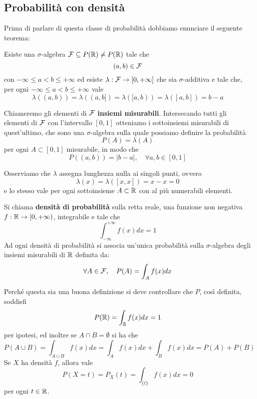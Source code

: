 \subsection{Probabilità con densità}
Prima di parlare di questa classe di probabilità dobbiamo enunciare il seguente teorema:
\begin{theorem}
	Esiste una $\sigma$-algebra $\mathcal{F} \subseteq P(\mathbb{R}) \neq P(\mathbb{R})$ tale che
	\[ (a, b) \in \mathcal{F} \]
	con $-\infty \leq a < b \leq +\infty$ ed esiste $\lambda : \mathcal{F} \to [0, +\infty]$ che sia
	$\sigma$-additiva e tale che, per ogni $-\infty \leq a < b \leq +\infty$ vale
	\[ \lambda((a,b)) = \lambda((a,b]) = \lambda ([a,b)) = \lambda([a,b]) = b - a \]
\end{theorem}

Chiameremo gli elementi di $\mathcal{F}$ \textbf{insiemi misurabili}. Intersecando tutti gli elementi di
$\mathcal{F}$ con l'intervallo $[0,1]$ otteniamo i sottoinsiemi misurabili di quest'ultimo, che sono una
$\sigma$-algebra sulla quale possiamo definire la probabilità
\[ P (A) = \lambda (A) \]
per ogni $A \subset [0,1]$ misurabile, in modo che
\[ P((a, b)) = |b - a|, \quad \forall a,b \in [0,1] \]

\begin{observation}
	Osserviamo che $\lambda$ assegna lunghezza nulla ai singoli punti, ovvero
	\[ \lambda(x) = \lambda([x,x]) = x - x = 0 \]
	e lo stesso vale per ogni sottoinsieme $A \subset \mathbb{R}$ con al più numerabili elementi.
\end{observation}

\begin{definition}
	Si chiama \textbf{densità di probabilità} sulla retta reale, una funzione non negativa
	$f : \mathbb{R} \to [0, +\infty)$, integrabile e tale che
	\[ \int_{-\infty}^{+\infty} f(x) dx = 1 \]
	Ad ogni densità di probabilità si associa un'unica probabilità sulla $\sigma$-algebra degli
	insiemi misurabili di $\mathbb{R}$ definita da:
	\[ \forall A \in \mathcal{F}, \quad P(A) = \int_A f(x) dx \]
\end{definition}

Perché questa sia una buona definizione si deve controllare che $P$, così definita, soddisfi
\[ P(\mathbb{R}) = \int_{\mathbb{R}} f(x) dx = 1 \]
per ipotesi, ed inoltre se $A \cap B = \emptyset$ si ha che
\[ P(A \cup B) = \int_{A \cup B} f(x) dx = \int_A f(x) dx + \int_B f(x) dx = P(A) + P(B) \]
Se $X$ ha densità $f$, allora vale
\[ P(X = t) = P_X (t) = \int_{\{t\}} f(x) dx = 0 \]
per ogni $t \in \mathbb{R}$.